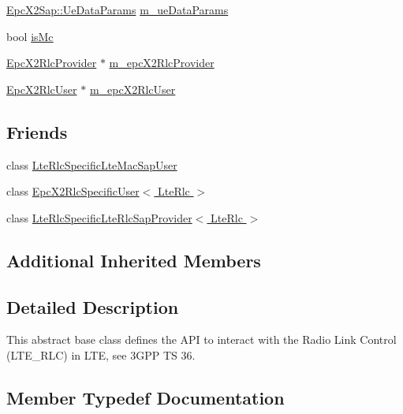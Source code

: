 \begin{DoxyCompactItemize}
\item 
\hyperlink{structns3_1_1EpcX2Sap_1_1UeDataParams}{Epc\+X2\+Sap\+::\+Ue\+Data\+Params} \hyperlink{classns3_1_1LteRlc_a6f4d5d0a7f8d3dd3c35a5fc0598ea3b8}{m\+\_\+ue\+Data\+Params}
\item 
bool \hyperlink{classns3_1_1LteRlc_a63b29f59aa944b3eaba8d8f156fba4c2}{is\+Mc}
\item 
\hyperlink{classns3_1_1EpcX2RlcProvider}{Epc\+X2\+Rlc\+Provider} $\ast$ \hyperlink{classns3_1_1LteRlc_aa997bbf2807b79443887abd57facd1c8}{m\+\_\+epc\+X2\+Rlc\+Provider}
\item 
\hyperlink{classns3_1_1EpcX2RlcUser}{Epc\+X2\+Rlc\+User} $\ast$ \hyperlink{classns3_1_1LteRlc_afa3f5aa58945c36aa3cde6059423da0f}{m\+\_\+epc\+X2\+Rlc\+User}
\end{DoxyCompactItemize}
\subsection*{Friends}
\begin{DoxyCompactItemize}
\item 
class \hyperlink{classns3_1_1LteRlc_a07cd42bcc0e12dd45a6b58712541ec0c}{Lte\+Rlc\+Specific\+Lte\+Mac\+Sap\+User}
\item 
class \hyperlink{classns3_1_1LteRlc_a33b43b7079174b08b9287b9237df9409}{Epc\+X2\+Rlc\+Specific\+User$<$ Lte\+Rlc $>$}
\item 
class \hyperlink{classns3_1_1LteRlc_a9814e095558688e5ad439f9153a5f55e}{Lte\+Rlc\+Specific\+Lte\+Rlc\+Sap\+Provider$<$ Lte\+Rlc $>$}
\end{DoxyCompactItemize}
\subsection*{Additional Inherited Members}


\subsection{Detailed Description}
This abstract base class defines the A\+PI to interact with the Radio Link Control (L\+T\+E\+\_\+\+R\+LC) in L\+TE, see 3\+G\+PP TS 36. 

\subsection{Member Typedef Documentation}
